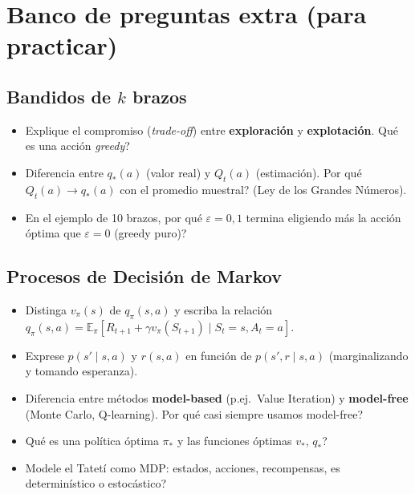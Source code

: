 \documentclass[11pt, a4paper]{article}
\begin{document}
\section*{Banco de preguntas extra (para practicar)}

\subsection*{Bandidos de $k$ brazos}
\begin{itemize}[nosep]
    \item Explique el compromiso (\emph{trade-off}) entre \textbf{exploraci\'on} y \textbf{explotaci\'on}. \textquestiondown Qu\'e es una acci\'on \emph{greedy}?
    \item Diferencia entre $q_*(a)$ (valor real) y $Q_t(a)$ (estimaci\'on). \textquestiondown Por qu\'e $Q_t(a)\to q_*(a)$ con el promedio muestral? (Ley de los Grandes N\'umeros).
    \item En el ejemplo de 10 brazos, \textquestiondown por qu\'e $\varepsilon=0{,}1$ termina eligiendo m\'as la acci\'on \'optima que $\varepsilon=0$ (greedy puro)?
\end{itemize}

\subsection*{Procesos de Decisi\'on de Markov}
\begin{itemize}[nosep]
    \item Distinga $v_\pi(s)$ de $q_\pi(s,a)$ y escriba la relaci\'on $q_\pi(s,a)=\mathbb{E}_\pi[R_{t+1}+\gamma v_\pi(S_{t+1})\mid S_t{=}s, A_t{=}a]$.
    \item Exprese $p(s'\mid s,a)$ y $r(s,a)$ en funci\'on de $p(s',r\mid s,a)$ (marginalizando y tomando esperanza).
    \item Diferencia entre m\'etodos \textbf{model-based} (p.ej.\ Value Iteration) y \textbf{model-free} (Monte Carlo, Q-learning). \textquestiondown Por qu\'e casi siempre usamos model-free?
    \item \textquestiondown Qu\'e es una pol\'itica \'optima $\pi_*$ y las funciones \'optimas $v_*$, $q_*$?
    \item Modele el Tatet\'i como MDP: estados, acciones, recompensas, \textquestiondown es determin\'istico o estoc\'astico?
\end{itemize}
\end{document}
